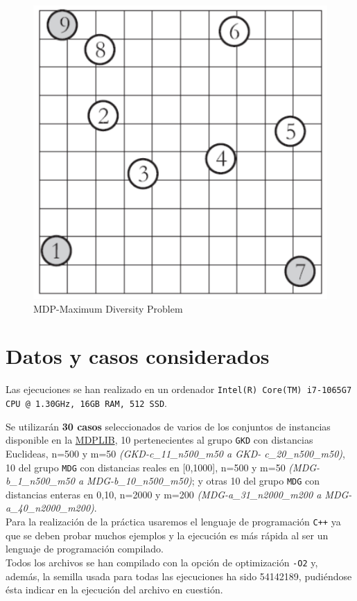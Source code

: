 \begin{figure}[H]
	\centering
	\includegraphics[scale=0.35]{img/mdp.png}
	\caption{MDP-Maximum Diversity Problem}
\end{figure}


\newpage
\section{Datos y casos considerados}
\hspace{1.5cm} Las ejecuciones se han realizado en un ordenador \texttt{Intel(R) Core(TM) i7-1065G7 CPU @ 1.30GHz, 16GB RAM, 512 SSD}. 


Se utilizarán \textbf{30 casos} seleccionados de varios de los conjuntos de instancias disponible en la \href{http://www.optsicom.es/mdp/}{MDPLIB}, 10 pertenecientes al grupo \texttt{GKD} con distancias Euclideas, n=500 y m=50 \textit{(GKD-c\_11\_n500\_m50 a GKD-
c\_20\_n500\_m50)}, 10 del grupo \texttt{MDG} con distancias reales en [0,1000], n=500 y m=50
\textit{(MDG-b\_1\_n500\_m50 a MDG-b\_10\_n500\_m50)}; y otras 10 del grupo \texttt{MDG} con distancias enteras en {0,10}, n=2000 y m=200 \textit{(MDG-a\_31\_n2000\_m200 a MDG-
a\_40\_n2000\_m200)}. \\


Para la realización de la práctica usaremos el lenguaje de programación \texttt{C++} ya que se deben probar muchos ejemplos y la ejecución es más rápida al ser un lenguaje de programación compilado. \\
Todos los archivos se han compilado con la opción de optimización \texttt{-O2} y, además,  la semilla usada para todas
las ejecuciones ha sido 54142189, pudiéndose ésta indicar en la ejecución del archivo en cuestión. 


